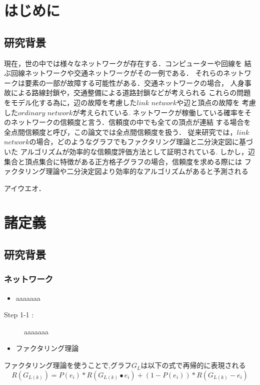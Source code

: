\documentclass[12pt]{optlab-bachelor}
\begin{document}
\frontmatter
\chapter{はじめに}
\section{研究背景}
現在，世の中では様々なネットワークが存在する．コンピューターや回線を
結ぶ回線ネットワークや交通ネットワークがその一例である．
それらのネットワークは要素の一部が故障する可能性がある．交通ネットワークの場合，
人身事故による路線封鎖や，交通整備による道路封鎖などが考えられる
これらの問題をモデル化する為に，辺の故障を考慮した$link$ $network$や辺と頂点の故障を
考慮した$ordinary$ $network$が考えられている.
ネットワークが稼働している確率をそのネットワークの信頼度と言う．信頼度の中でも全ての頂点が連結
する場合を全点間信頼度と呼び，この論文では全点間信頼度を扱う．
従来研究では，$link$ $network$の場合，どのようなグラフでもファクタリング理論と二分決定図に基づいた
アルゴリズムが効率的な信頼度評価方法として証明されている.
しかし，辺集合と頂点集合に特徴がある正方格子グラフの場合，信頼度を求める際には
ファクタリング理論や二分決定図より効率的なアルゴリズムがあると予測される

アイウエオ\cite{a-GAS}．

\chapter{諸定義}
\section{研究背景}
\subsection{ネットワーク}
\begin{itemize}
  \item aaaaaaa
\end{itemize}

\begin{description}
  \item[Step 1-1 : ] aaaaaaa
\end{description}

\begin{definition}
\end{definition}

\begin{theorem}
\end{theorem}
\begin{itemize}
  \item ファクタリング理論
\end{itemize}
ファクタリング理論を使うことで,グラフ$G_L$は以下の式で再帰的に表現される
$$R(G_{L(k)})=P(e_i)*R(G_{L(k)} \bullet e_i)+(1-P(e_i))*R(G_{L(k)} - e_i)$$
\begin{lemma}
\end{lemma}
\end{document}
